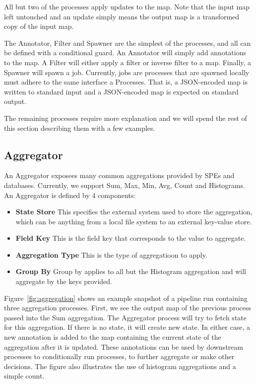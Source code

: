 \documentclass[10pt,twocolumn]{article}
\begin{document}
All but two of the processes apply updates to the map.  Note that the input map
left untouched and an update simply means the output map is a transformed copy
of the input map.

The Annotator, Filter and Spawner are the simplest of the processes, and all
can be defined with a conditional guard.  An Annotator will simply add
annotations to the map.  A Filter will either apply a filter or inverse filter
to a map.  Finally, a Spawner will spawn a job.  Currently, jobs are processes
that are spawned locally must adhere to the same interface a Processes.  That
is, a JSON-encoded map is written to standard input and a JSON-encoded map is
expected on standard output.

The remaining processes require more explanation and we will spend the rest of
this section describing them with a few examples.

\subsection{Aggregator}

An Aggregator exposees many common aggregations provided by SPEs and databases.  Currently,
we support Sum, Max, Min, Avg, Count and Histograms.  An Aggregator is defined by 4 components:

\begin{itemize}
\item{{\bfseries State Store}} This specifies the external system used to store
the aggregation, which can be anything from a local file system to an external
key-value store.
\item{{\bfseries Field Key}} This is the field key that corresponds to the value to aggregate.
\item{{\bfseries Aggregation Type}} This is the type of aggregatioon to apply.
\item{{\bfseries Group By}} Group by applies to all but the Histogram aggregation and will aggregate by the keys provided.
\end{itemize}

Figure~\ref{fig:aggregation} shows an example snapshot of a pipeline run
containing three aggregation processes.  First, we see the output map of the
previous process passed into the Sum aggregation.  The Aggregator process will
try to fetch state for this aggregation.  If there is no state, it will create
new state.  In either case, a new annotation is added to the map containing the
current state of the aggregation after it is updated.  These annotations can be
used by downstream processes to conditionally run processes, to further
aggregate or make other decisions.  The figure also illustrates the use of
histogram aggregations and a simple count.
\end{document}
